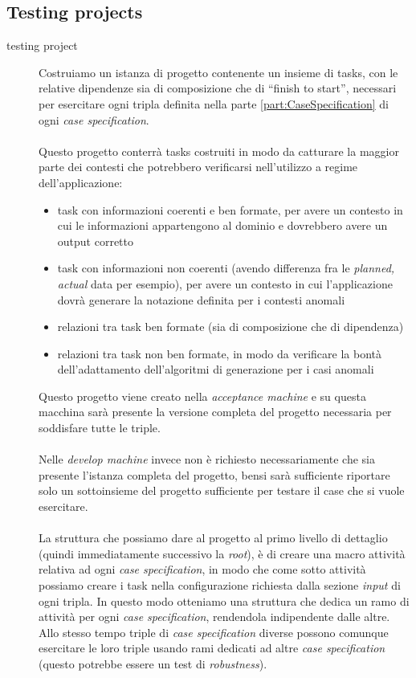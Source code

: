 \subsection{Testing projects}
\begin{description}
\item[testing project] Costruiamo un istanza di progetto contenente un insieme
di tasks, con le relative dipendenze sia di composizione che di ``finish to start'', necessari per
esercitare ogni tripla definita nella parte \ref{part:CaseSpecification} di 
ogni \emph{case specification}.
\\ \\
Questo progetto conterr\`a tasks costruiti in modo da catturare la maggior
parte dei contesti che potrebbero verificarsi nell'utilizzo a regime
dell'applicazione:
\begin{itemize}
  \item task con informazioni coerenti e ben formate, per avere un contesto in
  cui le informazioni appartengono al dominio e dovrebbero avere un output
  corretto
  \item task con informazioni non coerenti (avendo differenza fra le
  \emph{planned, actual} data per esempio), per avere un contesto in cui
  l'applicazione dovr\`a generare la notazione definita per i contesti anomali
  \item relazioni tra task ben formate (sia di composizione che di dipendenza)
  \item relazioni tra task non ben formate, in modo da verificare la bont\`a
  dell'adattamento dell'algoritmi di generazione per i casi anomali
\end{itemize} 
Questo progetto viene creato nella \emph{acceptance
machine} e su questa macchina sar\`a presente la versione completa del progetto necessaria per
soddisfare tutte le triple. 
\\ \\
Nelle \emph{develop machine} invece non \`e
richiesto necessariamente che sia presente l'istanza completa del progetto,
bensi sar\`a sufficiente riportare solo un sottoinsieme del progetto
sufficiente per testare il case che si vuole esercitare.
\\ \\
La struttura che possiamo dare al progetto al primo livello di dettaglio
(quindi immediatamente successivo la \emph{root}), \`e di creare una macro
attivit\`a relativa ad ogni \emph{case specification}, in modo che come sotto
attivit\`a possiamo creare i task nella configurazione richiesta dalla sezione
\emph{input} di ogni tripla. In questo modo otteniamo una struttura
che dedica un ramo di attivit\`a per ogni \emph{case specification}, rendendola
indipendente dalle altre. Allo stesso tempo triple di \emph{case specification}
 diverse possono comunque esercitare le loro triple usando rami dedicati ad
 altre \emph{case specification} (questo potrebbe essere un test di
 \emph{robustness}).
 

\end{description}

